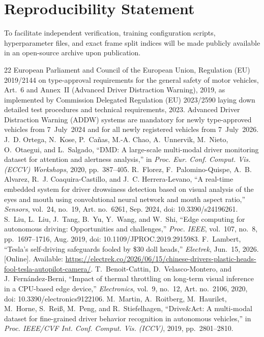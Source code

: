 \documentclass[conference]{IEEEtran}
\begin{document}
\section*{Reproducibility Statement}
To facilitate independent verification, training configuration scripts, hyperparameter files, and exact frame split indices will be made publicly available in an open-source archive upon publication.
\begin{thebibliography}{22}
\sloppy
{} European Parliament and Council of the European Union, Regulation (EU) 2019/2144 on type-approval requirements for the general safety of motor vehicles, Art.~6 and Annex~II (Advanced Driver Distraction Warning), 2019, as implemented by Commission Delegated Regulation (EU) 2023/2590 laying down detailed test procedures and technical requirements, 2023. Advanced Driver Distraction Warning (ADDW) systems are mandatory for newly type-approved vehicles from 7~July~2024 and for all newly registered vehicles from 7~July~2026.
 J.~D. Ortega, N.~Kose, P.~Ca\~{n}as, M.-A. Chao, A.~Unnervik, M.~Nieto, O.~Otaegui, and L.~Salgado, ``DMD: A large-scale multi-modal driver monitoring dataset for attention and alertness analysis,'' in \emph{Proc. Eur. Conf. Comput. Vis. (ECCV) Workshops}, 2020, pp.~387--405.
 R.~Florez, F.~Palomino-Quispe, A.~B. Alvarez, R.~J. Coaquira-Castillo, and J.~C. Herrera-Levano, ``A real-time embedded system for driver drowsiness detection based on visual analysis of the eyes and mouth using convolutional neural network and mouth aspect ratio,'' \emph{Sensors}, vol.~24, no.~19, Art. no.~6261, Sep. 2024, doi: 10.3390/s24196261.
 S.~Liu, L.~Liu, J.~Tang, B.~Yu, Y.~Wang, and W.~Shi, ``Edge computing for autonomous driving: Opportunities and challenges,'' \emph{Proc. IEEE}, vol.~107, no.~8, pp.~1697--1716, Aug. 2019, doi: 10.1109/JPROC.2019.2915983.
 F.~Lambert, ``Tesla's self-driving safeguards fooled by \$30 doll heads,'' \emph{Electrek}, Jun.~15, 2026. [Online]. Available: \url{https://electrek.co/2026/06/15/chinese-drivers-plastic-heads-fool-tesla-autopilot-camera/}.
 T.~Benoit-Cattin, D.~Velasco-Montero, and J.~Fern\'{a}ndez-Berni, ``Impact of thermal throttling on long-term visual inference in a CPU-based edge device,'' \emph{Electronics}, vol.~9, no.~12, Art. no.~2106, 2020, doi: 10.3390/electronics9122106.
 M.~Martin, A.~Roitberg, M.~Haurilet, M.~Horne, S.~Rei{\ss}, M.~Peng, and R.~Stiefelhagen, ``Drive\&Act: A multi-modal dataset for fine-grained driver behavior recognition in autonomous vehicles,'' in \emph{Proc. IEEE/CVF Int. Conf. Comput. Vis. (ICCV)}, 2019, pp.~2801--2810.

\end{thebibliography}
\end{document}
